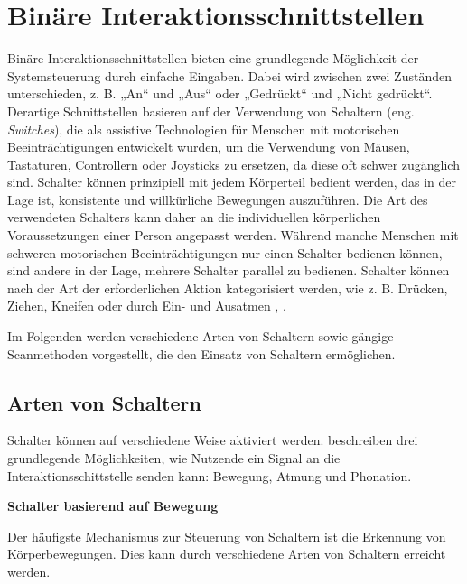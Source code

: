 \section{Binäre Interaktionsschnittstellen}

Binäre Interaktionsschnittstellen bieten eine grundlegende Möglichkeit der Systemsteuerung durch einfache Eingaben. Dabei wird zwischen zwei Zuständen unterschieden, z. B.  „An“ und „Aus“ oder „Gedrückt“ und „Nicht gedrückt“. Derartige Schnittstellen basieren auf der Verwendung von Schaltern (eng. \textit{Switches}), die als assistive Technologien für Menschen mit motorischen Beeinträchtigungen entwickelt wurden, um die Verwendung von Mäusen, Tastaturen, Controllern oder Joysticks zu ersetzen, da diese oft schwer zugänglich sind. Schalter können prinzipiell mit jedem Körperteil bedient werden, das in der Lage ist, konsistente und willkürliche Bewegungen auszuführen. Die Art des verwendeten Schalters kann daher an die individuellen körperlichen Voraussetzungen einer Person angepasst werden. Während manche Menschen mit schweren motorischen Beeinträchtigungen nur einen Schalter bedienen können, sind andere in der Lage, mehrere Schalter parallel zu bedienen. Schalter können nach der Art der erforderlichen Aktion kategorisiert werden, wie z. B.  Drücken, Ziehen, Kneifen oder durch Ein- und Ausatmen \citep{yuan_game_2011}, \citep{Weber22111996}. 

Im Folgenden werden verschiedene Arten von Schaltern sowie gängige Scanmethoden vorgestellt, die den Einsatz von Schaltern ermöglichen.

\subsection{Arten von Schaltern}

Schalter können auf verschiedene Weise aktiviert werden. \cite{COOK2015117} beschreiben drei grundlegende Möglichkeiten, wie Nutzende ein Signal an die Interaktionsschittstelle senden kann: Bewegung, Atmung und Phonation.

\textbf{Schalter basierend auf Bewegung}

Der häufigste Mechanismus zur Steuerung von Schaltern ist die Erkennung von Körperbewegungen. Dies kann durch verschiedene Arten von Schaltern erreicht werden.

